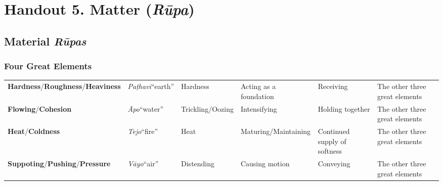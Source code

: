 \documentclass[a4 paper, 12pt]{article}
\begin{document}
\pagestyle{empty}

\section*{Handout 5. Matter (\textit{Rūpa})}

\subsection*{Material \textit{Rūpas}}

\subsubsection*{Four Great Elements}

\setlength{\tabcolsep}{0pt}
\renewcommand{\arraystretch}{1.1}

\begin{tabular}{P{0.21\textwidth} | C{.13\textwidth} C{.165\textwidth} C{0.165\textwidth} C{0.165\textwidth} C{0.165\textwidth} m{0mm}}
\toprule
 &  &  &  &  & \\
\midrule
\textbf{Hardness}/\newline \textbf{Roughness}/\newline \textbf{Heaviness} & \textit{Paṭhavī}\newline “earth” & Hardness & Acting as a foundation & Receiving & The other three great elements &\\[9mm]
\textbf{Flowing}/\newline \textbf{Cohesion} & \textit{Āpo}\newline “water” & Trickling/\newline Oozing & Intensifying & Holding together & The other three great elements &\\[9mm]
\textbf{Heat}/\newline \textbf{Coldness} & \textit{Tejo}\newline “fire” & Heat & Maturing/\newline Maintaining & Continued supply of softness & The other three great elements &\\[9mm]
\textbf{Suppoting}/\newline \textbf{Pushing}/\newline \textbf{Pressure} & \textit{Vāyo}\newline “air” & Distending & Causing motion & Conveying & The other three great elements &\\[9mm]
\bottomrule
\end{tabular} 
\end{document}
